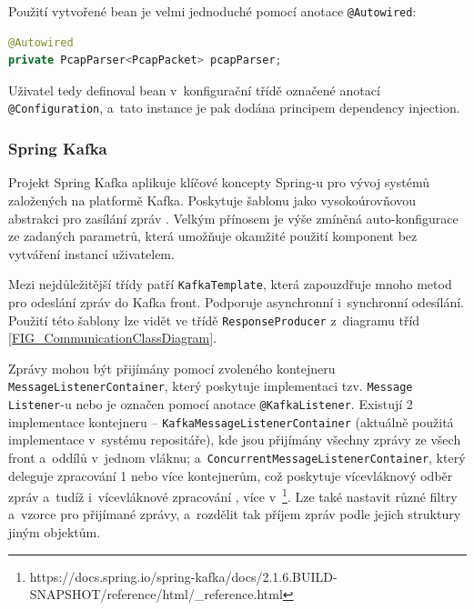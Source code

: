 \noindent Použití vytvořené bean je velmi jednoduché pomocí anotace \texttt{@Autowired}:

\begin{lstlisting}[language=Java,frame=tb,basicstyle={\small\ttfamily}]
@Autowired
private PcapParser<PcapPacket> pcapParser;
\end{lstlisting}

\noindent Uživatel tedy definoval bean v~konfigurační třídě označené anotací \texttt{@Configuration}, a~tato instance je pak dodána principem dependency injection.

\subsubsection{Spring Kafka} \label{springKafka}
Projekt Spring Kafka aplikuje klíčové koncepty Spring-u pro vývoj systémů založených na platformě Kafka. Poskytuje šablonu jako vysokoúrovňovou abstrakci pro zasílání zpráv \cite{springKafka}. Velkým přínosem je výše zmíněná auto-konfigurace ze zadaných parametrů, která umožňuje okamžité použití komponent bez vytváření instancí uživatelem.

Mezi nejdůležitější třídy patří \texttt{KafkaTemplate}, která zapouzdřuje mnoho metod pro odeslání zpráv do Kafka front. Podporuje asynchronní i~synchronní odesílání. Použití této šablony lze vidět ve třídě \texttt{ResponseProducer} z~diagramu tříd \ref{FIG_CommunicationClassDiagram}.

Zprávy mohou být přijímány pomocí zvoleného kontejneru \texttt{MessageListenerContainer}, který poskytuje implementaci tzv. \texttt{Message Listener}-u nebo je označen pomocí anotace \texttt{@KafkaListener}. Existují 2 implementace kontejneru -- \texttt{KafkaMessageListenerContainer} (aktuálně použitá implementace v~systému repositáře), kde jsou přijímány všechny zprávy ze všech front a~oddílů v~jednom vláknu; a~\texttt{ConcurrentMessageListenerContainer}, který deleguje zpracování 1 nebo více kontejnerům, což poskytuje vícevláknový odběr zpráv a~tudíž i~vícevláknové zpracování \cite{springKafka}, více v~\footnote{https://docs.spring.io/spring-kafka/docs/2.1.6.BUILD-SNAPSHOT/reference/html/\_reference.html}. Lze také nastavit různé filtry a~vzorce pro přijímané zprávy, a~rozdělit tak příjem zpráv podle jejich struktury jiným objektům.

